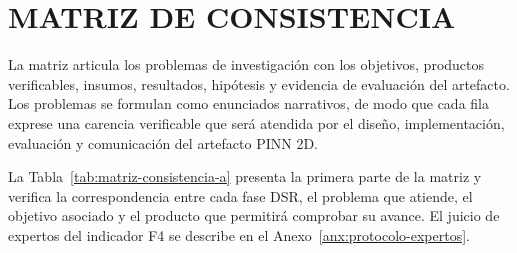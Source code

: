 \section{MATRIZ DE CONSISTENCIA}
\label{anx:matriz-consistencia}
\thispagestyle{empty}
\scriptsize
La matriz articula los problemas de investigación con los objetivos, productos verificables, insumos, resultados, hipótesis y evidencia de evaluación del artefacto. Los problemas se formulan como enunciados narrativos, de modo que cada fila exprese una carencia verificable que será atendida por el diseño, implementación, evaluación y comunicación del artefacto PINN 2D.

La Tabla~\ref{tab:matriz-consistencia-a} presenta la primera parte de la matriz y verifica la correspondencia entre cada fase DSR, el problema que atiende, el objetivo asociado y el producto que permitirá comprobar su avance. El juicio de expertos del indicador F4 se describe en el Anexo~\ref{anx:protocolo-expertos}.

\setlength{\tabcolsep}{3pt}
\renewcommand{\arraystretch}{1.18}

